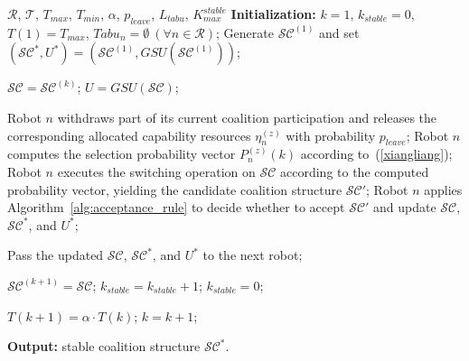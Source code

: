 \documentclass[journal,twoside,web]{ieeecolor}
\begin{document}
\begin{algorithm}[!t]
\caption{Tabu-Enhanced Simulated Annealing Heuristic for Distributed Overlapping Coalition Formation}
\label{alg:bhta_internal_search}
\begin{algorithmic}[1]
\REQUIRE $\mathcal{R}$, $\mathcal{T}$, $T_{max}$, $T_{min}$, $\alpha$, $p_{leave}$, $L_{tabu}$, $K_{max}^{stable}$
\STATE \textbf{Initialization:} $k = 1$, $k_{stable} = 0$, $T(1) = T_{max}$, $\mathit{Tabu}_n = \emptyset~(\forall n \in \mathcal{R})$;
\STATE Generate $\mathcal{SC}^{(1)}$ and set $(\mathcal{SC}^*, U^*) = (\mathcal{SC}^{(1)}, GSU(\mathcal{SC}^{(1)}))$;

    \STATE $\mathcal{SC} = \mathcal{SC}^{(k)}$; $U = GSU(\mathcal{SC})$;

\STATE Robot $n$ withdraws part of its current coalition participation and releases the corresponding allocated capability resources $\eta_n^{(z)}$ with probability $p_{leave}$;
\STATE Robot $n$ computes the selection probability vector $P_n^{(z)}(k)$ according to~(\ref{xiangliang});
\STATE Robot $n$ executes the switching operation on $\mathcal{SC}$ according to the computed probability vector, yielding the candidate coalition structure $\mathcal{SC}'$;
\STATE Robot $n$ applies Algorithm~\ref{alg:acceptance_rule} to decide whether to accept $\mathcal{SC}'$ and update $\mathcal{SC}$, $\mathcal{SC}^*$, and $U^*$;

        \STATE Pass the updated $\mathcal{SC}$, $\mathcal{SC}^*$, and $U^*$ to the next robot;
    \ENDFOR

    \STATE $\mathcal{SC}^{(k+1)} = \mathcal{SC}$;
        \STATE $k_{stable} = k_{stable} + 1$;
    \ELSE
        \STATE $k_{stable} = 0$;
    \ENDIF

    \STATE $T(k+1) = \alpha \cdot T(k)$; $k = k + 1$;
\ENDWHILE

\STATE \textbf{Output:} stable coalition structure $\mathcal{SC}^*$.
\end{algorithmic}
\end{algorithm}
\end{document}
